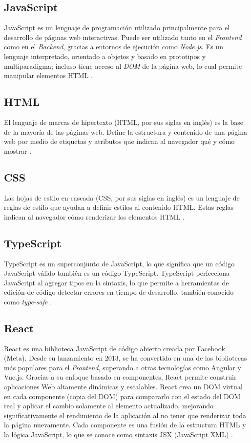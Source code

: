 \subsection{JavaScript}
JavaScript es un lenguaje de programación utilizado principalmente para el desarrollo de páginas web interactivas. Puede ser
utilizado tanto en el \textit{Frontend} como en el \textit{Backend}, gracias a entornos de ejecución como \textit{Node.js}.
Es un lenguaje interpretado, orientado a objetos y basado en prototipos y multiparadigma; incluso tiene acceso al
\textit{DOM} de la página web, lo cual permite manipular elementos HTML \cite{aws2025javascript}.

\subsection{HTML}
El lenguaje de marcas de hipertexto (HTML, por sus siglas en inglés) es la base de la mayoría de las páginas web. Define la
estructura y contenido de una página web por medio de etiquetas y atributos que indican al navegador qué y cómo mostrar
\cite{aws2025javascript}.

\subsection{CSS}
Las hojas de estilo en cascada (CSS, por sus siglas en inglés) es un lenguaje de reglas de estilo que ayudan a definir estilos
al contenido HTML. Estas reglas indican al navegador cómo renderizar los elementos HTML \cite{aws2025javascript}.

\subsection{TypeScript}
TypeScript es un superconjunto de JavaScript, lo que significa que un código JavaScript válido también es un código TypeScript.
TypeScript perfecciona JavaScript al agregar tipos en la sintaxis, lo que permite a herramientas de edición de código detectar
errores en tiempo de desarrollo, también conocido como \textit{\gls{type-safe}} \cite{aws2025javascript}.

\subsection{React}
React es una biblioteca JavaScript de código abierto creada por Facebook (Meta). Desde su lanzamiento en 2013, se ha convertido
en una de las bibliotecas más populares para el \textit{Frontend}, superando a otras tecnologías como Angular y Vue.js.
Gracias a su enfoque basado en componentes, React permite construir aplicaciones Web altamente dinámicas y escalables.
React crea un DOM virtual en cada componente (copia del DOM) para compararlo con el estado del DOM real y aplicar el cambio 
solamente al elemento actualizado, mejorando significativamente el rendimiento de la aplicación al no tener que renderizar 
toda la página nuevamente. Cada componente es una fusión de la estructura HTML y la lógica JavaScript, lo que se conoce como
sintaxis JSX (JavaScript XML) \cite{saavedra2023react}.

